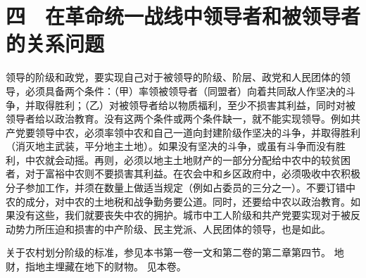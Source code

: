 \section{四　在革命统一战线中领导者和被领导者的关系问题}

领导的阶级和政党，要实现自己对于被领导的阶级、阶层、政党和人民团体的领导，必须具备两个条件：（甲）率领被领导者（同盟者）向着共同敌人作坚决的斗争，并取得胜利；（乙）对被领导者给以物质福利，至少不损害其利益，同时对被领导者给以政治教育。没有这两个条件或两个条件缺一，就不能实现领导。例如共产党要领导中农，必须率领中农和自己一道向封建阶级作坚决的斗争，并取得胜利（消灭地主武装，平分地主土地）。如果没有坚决的斗争，或虽有斗争而没有胜利，中农就会动摇。再则，必须以地主土地财产的一部分分配给中农中的较贫困者，对于富裕中农则不要损害其利益。在农会中和乡区政府中，必须吸收中农积极分子参加工作，并须在数量上做适当规定（例如占委员的三分之一）。不要订错中农的成分，对中农的土地税和战争勤务要公道。同时，还要给中农以政治教育。如果没有这些，我们就要丧失中农的拥护。城市中工人阶级和共产党要实现对于被反动势力所压迫和损害的中产阶级、民主党派、人民团体的领导，也是如此。


\begin{maonote}
关于农村划分阶级的标准，参见本书第一卷一文和第二卷的第二章第四节。
地财，指地主埋藏在地下的财物。
见本卷。
\end{maonote}
